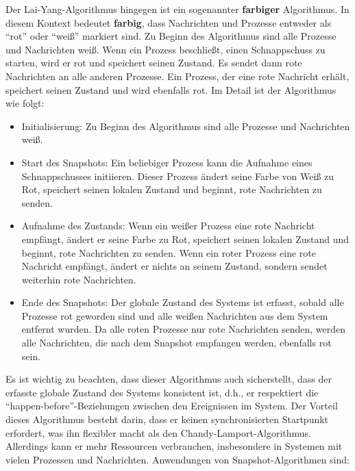 Der Lai-Yang-Algorithmus hingegen ist ein sogenannter \textbf{farbiger} Algorithmus. In diesem Kontext bedeutet \textbf{farbig}, dass Nachrichten und Prozesse entweder als \enquote{rot} oder \enquote{weiß} markiert sind. Zu Beginn des Algorithmus sind alle Prozesse und Nachrichten weiß. Wenn ein Prozess beschließt, einen Schnappschuss zu starten, wird er rot und speichert seinen Zustand. Es sendet dann rote Nachrichten an alle anderen Prozesse. Ein Prozess, der eine rote Nachricht erhält, speichert seinen Zustand und wird ebenfalls rot. 
Im Detail ist der Algorithmus wie folgt:
\begin{itemize}
\item Initialisierung: Zu Beginn des Algorithmus sind alle Prozesse und Nachrichten weiß.
\item Start des Snapshots: Ein beliebiger Prozess kann die Aufnahme eines Schnappschusses initiieren. Dieser Prozess ändert seine Farbe von Weiß zu Rot, speichert seinen lokalen Zustand und beginnt, rote Nachrichten zu senden.
\item Aufnahme des Zustands: Wenn ein weißer Prozess eine rote Nachricht empfängt, ändert er seine Farbe zu Rot, speichert seinen lokalen Zustand und beginnt, rote Nachrichten zu senden. Wenn ein roter Prozess eine rote Nachricht empfängt, ändert er nichts an seinem Zustand, sondern sendet weiterhin rote Nachrichten.
\item Ende des Snapshots: Der globale Zustand des Systems ist erfasst, sobald alle Prozesse rot geworden sind und alle weißen Nachrichten aus dem System entfernt wurden. Da alle roten Prozesse nur rote Nachrichten senden, werden alle Nachrichten, die nach dem Snapshot empfangen werden, ebenfalls rot sein.
\end{itemize}
Es ist wichtig zu beachten, dass dieser Algorithmus auch sicherstellt, dass der erfasste globale Zustand des Systems konsistent ist, d.h., er respektiert die \enquote{happen-before}-Beziehungen zwischen den Ereignissen im System.  Der Vorteil dieses Algorithmus besteht darin, dass er keinen synchronisierten Startpunkt erfordert, was ihn flexibler macht als den Chandy-Lamport-Algorithmus. Allerdings kann er mehr Ressourcen verbrauchen, insbesondere in Systemen mit vielen Prozessen und Nachrichten. Anwendungen von Snapshot-Algorithmen sind:
